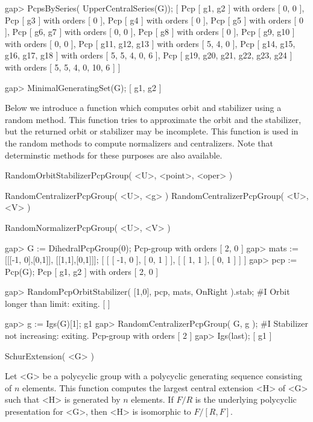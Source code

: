 gap> PcpsBySeries( UpperCentralSeries(G));
[ Pcp [ g1, g2 ] with orders [ 0, 0 ],
  Pcp [ g3 ] with orders [ 0 ],
  Pcp [ g4 ] with orders [ 0 ],
  Pcp [ g5 ] with orders [ 0 ],
  Pcp [ g6, g7 ] with orders [ 0, 0 ],
  Pcp [ g8 ] with orders [ 0 ],
  Pcp [ g9, g10 ] with orders [ 0, 0 ],
  Pcp [ g11, g12, g13 ] with orders [ 5, 4, 0 ],
  Pcp [ g14, g15, g16, g17, g18 ] with orders [ 5, 5, 4, 0, 6 ],
  Pcp [ g19, g20, g21, g22, g23, g24 ] with orders [ 5, 5, 4, 0, 10, 6 ] ]

gap> MinimalGeneratingSet(G);
[ g1, g2 ]
\endexample



Below we introduce a function which computes orbit and stabilizer using 
a random method. This function tries to approximate the orbit and the 
stabilizer, but the returned orbit or stabilizer may be incomplete. 
This function is used in the random methods to compute normalizers and 
centralizers. Note that determinstic methods for these purposes are also
available.

\> RandomOrbitStabilizerPcpGroup( <U>, <point>, <oper> )

\> RandomCentralizerPcpGroup( <U>, <g> )
\> RandomCentralizerPcpGroup( <U>, <V> )

\> RandomNormalizerPcpGroup( <U>, <V> )

\beginexample
gap> G := DihedralPcpGroup(0);
Pcp-group with orders [ 2, 0 ]
gap> mats := [[[-1, 0],[0,1]], [[1,1],[0,1]]];
[ [ [ -1, 0 ], [ 0, 1 ] ], [ [ 1, 1 ], [ 0, 1 ] ] ]
gap> pcp := Pcp(G);
Pcp [ g1, g2 ] with orders [ 2, 0 ]

gap> RandomPcpOrbitStabilizer( [1,0], pcp, mats, OnRight ).stab;
#I  Orbit longer than limit: exiting.
[  ]

gap> g := Igs(G)[1];
g1
gap> RandomCentralizerPcpGroup( G, g );
#I  Stabilizer not increasing: exiting.
Pcp-group with orders [ 2 ]
gap> Igs(last);
[ g1 ]
\endexample


\>SchurExtension( <G> )

Let <G> be a polycyclic group with a polycyclic generating sequence
consisting of $n$ elements.  This function computes the largest
central extension <H> of  <G> such that <H> is generated by $n$
elements.  If $F/R$ is the underlying polycyclic presentation for <G>,
then <H> is isomorphic to $F/[R,F]$. 

